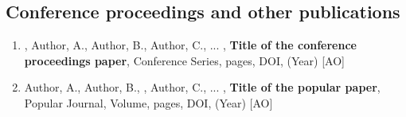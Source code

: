 \subsection*{Conference proceedings and other publications}

\begin{enumerate}
    
    \item {}, Author, A., Author, B., Author, C., ... , 
    \textbf{Title of the conference proceedings paper}, Conference Series, pages, DOI, (Year) [AO]
    
    \item Author, A., Author, B., , Author, C., ... ,     \textbf{Title of the popular paper}, Popular Journal, Volume, pages, DOI, (Year) [AO]
    
    
\end{enumerate}

